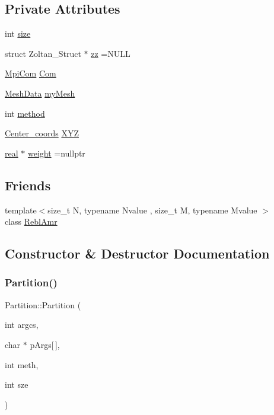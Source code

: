 \subsection*{Private Attributes}
\begin{DoxyCompactItemize}
\item 
int \mbox{\hyperlink{classPartition_a718bdba639f222d90d23480b58caa1f9}{size}}
\item 
struct Zoltan\+\_\+\+Struct $\ast$ \mbox{\hyperlink{classPartition_a22c16cf67f6139f29e52b04ae03f22da}{zz}} =N\+U\+LL
\item 
\mbox{\hyperlink{structMpiCom}{Mpi\+Com}} \mbox{\hyperlink{classPartition_a40cdff1a2a978d2d3afef76f89f77315}{Com}}
\item 
\mbox{\hyperlink{structMeshData}{Mesh\+Data}} \mbox{\hyperlink{classPartition_a1dd04c2f5f7bf180b4b11058324dfd1a}{my\+Mesh}}
\item 
int \mbox{\hyperlink{classPartition_a2020845648e68361210ac8c0dbef2d0a}{method}}
\item 
\mbox{\hyperlink{typedefs_8h_a3ad6a5c3a7054ba718206a93e3af25b7}{Center\+\_\+coords}} \mbox{\hyperlink{classPartition_af4ec081f50a82bac1899e1729a92dcc8}{X\+YZ}}
\item 
\mbox{\hyperlink{definitions_8h_aedc0ad84d1e764530814f57ad931d02a}{real}} $\ast$ \mbox{\hyperlink{classPartition_a9371a86039815d9e187a8e414c94d372}{weight}} =nullptr
\end{DoxyCompactItemize}
\subsection*{Friends}
\begin{DoxyCompactItemize}
\item 
{\footnotesize template$<$size\+\_\+t N, typename Nvalue , size\+\_\+t M, typename Mvalue $>$ }\\class \mbox{\hyperlink{classPartition_a8d90a8b4dd53f0733e15d6eed6d2dcdd}{Rebl\+Amr}}
\end{DoxyCompactItemize}


\subsection{Constructor \& Destructor Documentation}
\mbox{\label{classPartition_a689f61995d4ad15721d032ce7b6b696e}} 
\subsubsection{\texorpdfstring{Partition()}{Partition()}\hspace{0.1cm}{\footnotesize\ttfamily [1/2]}}
{\footnotesize\ttfamily Partition\+::\+Partition (\begin{DoxyParamCaption}\item[{int}]{argcs,  }\item[{char $\ast$}]{p\+Args\mbox{[}$\,$\mbox{]},  }\item[{int}]{meth,  }\item[{int}]{sze }\end{DoxyParamCaption})}

